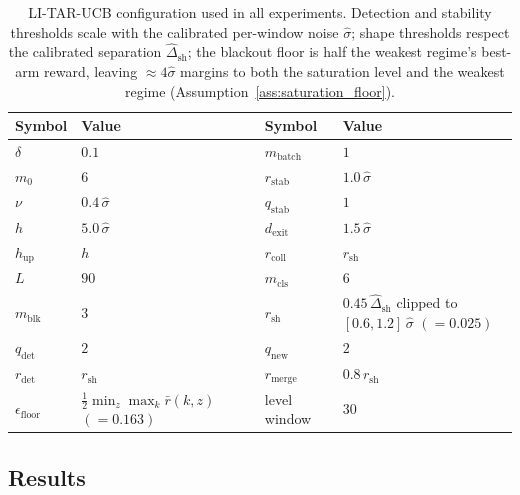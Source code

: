 \documentclass[11pt]{article}
\begin{document}
\begin{table}[h]
\centering
\begin{tabular}{llll}
\toprule
Symbol & Value & Symbol & Value \\
\midrule
$\delta$ & $0.1$ & $m_{\mathrm{batch}}$ & $1$ \\
$m_0$ & $6$ & $r_{\mathrm{stab}}$ & $1.0\,\widehat\sigma$ \\
$\nu$ & $0.4\,\widehat\sigma$ & $q_{\mathrm{stab}}$ & $1$ \\
$h$ & $5.0\,\widehat\sigma$ & $d_{\mathrm{exit}}$ & $1.5\,\widehat\sigma$ \\
$h_{\mathrm{up}}$ & $h$ & $r_{\mathrm{coll}}$ & $r_{\mathrm{sh}}$ \\
$L$ & $90$ & $m_{\mathrm{cls}}$ & $6$ \\
$m_{\mathrm{blk}}$ & $3$ & $r_{\mathrm{sh}}$ & $0.45\,\widehat\Delta_{\mathrm{sh}}$ clipped to $[0.6,1.2]\,\widehat\sigma$ $(=0.025)$ \\
$q_{\mathrm{det}}$ & $2$ & $q_{\mathrm{new}}$ & $2$ \\
$r_{\mathrm{det}}$ & $r_{\mathrm{sh}}$ & $r_{\mathrm{merge}}$ & $0.8\,r_{\mathrm{sh}}$ \\
$\epsilon_{\mathrm{floor}}$ & $\tfrac12\min_z\max_k\bar r(k,z)$ $(=0.163)$ & level window & $30$ \\
\bottomrule
\end{tabular}
\caption{LI-TAR-UCB configuration used in all experiments. Detection and stability thresholds scale with the calibrated per-window noise $\widehat\sigma$; shape thresholds respect the calibrated separation $\widehat\Delta_{\mathrm{sh}}$; the blackout floor is half the weakest regime's best-arm reward, leaving $\approx4\widehat\sigma$ margins to both the saturation level and the weakest regime (Assumption~\ref{ass:saturation_floor}).}
\label{tab:config}
\end{table}

\subsection{Results}
\label{subsec:results}
\end{document}
